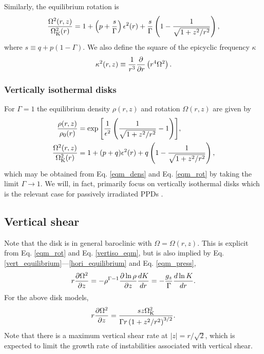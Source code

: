 Similarly, the equilibrium rotation is 
\begin{align}\label{eqm_rot}
  \frac{\Omega^2(r,z)}{\Omega_{\rm K}^2(r)}=1 +
  \left(p+\frac{s}{\Gamma}\right)\epsilon^2(r) 
  +\frac{s}{\Gamma} \left(1-\frac{1}{\sqrt{1+z^2/r^2}}\right), 
\end{align}
where $s\equiv q+p(1-\Gamma)$. We also define %
the square of the epicyclic frequency $\kappa$ 
\begin{align}
  \kappa^2(r,z) \equiv \frac{1}{r^3}\frac{\p }{\p
    r}\left(r^4\Omega^2\right). %
\end{align}


\subsubsection{Vertically isothermal disks}
For $\Gamma=1$ the equilibrium density $\rho(r,z)$ and rotation
$\Omega(r,z)$ are given by 
\begin{align}
  \frac{\rho(r,z)}{\rho_0(r)} &=
  \exp{\left[\frac{1}{\epsilon^2}\left(\frac{1}{\sqrt{1+z^2/r^2}}-1\right)\right]},\\    
  \frac{\Omega^2(r,z)}{\Omega_{\rm K}^2(r)}& =1+ (p+q)\epsilon^2(r) + q\left(1 -
    \frac{1}{\sqrt{1+z^2/r^2}}\right),\label{vertiso_eqm}
\end{align}
which may be obtained from Eq. \ref{eqm_dens} and Eq. \ref{eqm_rot} by
taking the limit $\Gamma\to 1$. We will, in fact, primarily focus on
vertically isothermal disks which is the relevant case for passively irradiated
PPDs \citep{chiang97}. 


\subsection{Vertical shear}\label{vshear_def}
Note that the disk is in general baroclinic with $\Omega =
\Omega(r,z)$. This is explicit from Eq. \ref{eqm_rot} and Eq. \ref{vertiso_eqm}, but is also 
implied by Eq. \ref{vert_equilibrium}---\ref{hori_equilibrium} and 
Eq. \ref{eqm_press},  
\begin{align}
  r\frac{\partial\Omega^2}{\partial z} = - \rho^{\Gamma-1}\frac{\partial\ln\rho}{\partial
    z}\frac{dK}{dr} = - \frac{g_z}{\Gamma}\frac{d\ln K}{dr}.\label{vertical_shear}
\end{align}
For the above disk models,
\begin{align}
  r\frac{\partial\Omega^2}{\partial z} = \frac{sz\Omega_{\rm K}^2}{\Gamma
    r\left(1+z^2/r^2\right)^{3/2}}. \label{vertical_shear_ex} 
\end{align}
Note that there is a maximum vertical shear rate at $|z|=r/\sqrt{2}$,
which is expected to limit the growth rate of instabilities associated with vertical shear. 

